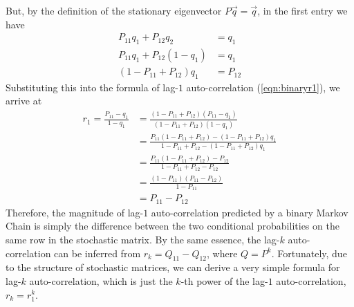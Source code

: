 But, by the definition of the stationary eigenvector $P\vec{q} = \vec{q}$, in the first entry we have
\begin{align*}
P_{11}q_1 + P_{12}q_2 &= q_1 \\
P_{11}q_1 + P_{12}(1-q_1) &= q_1 \\
(1 - P_{11} + P_{12}) q_1 &= P_{12}
\end{align*}
Substituting this into the formula of lag-$1$ auto-correlation (\ref{eqn:binaryr1}), we arrive at
\begin{align}
r_1 = \frac{P_{11}-q_1}{1-q_1} &= \frac{(1 - P_{11} + P_{12})(P_{11}-q_1)}{(1 - P_{11} + P_{12})(1-q_1)}  \nonumber \\
&= \frac{P_{11}(1 - P_{11} + P_{12}) - (1 - P_{11} + P_{12})q_1}{1 - P_{11} + P_{12} - (1 - P_{11} + P_{12})q_1}  \nonumber \\
&= \frac{P_{11}(1 - P_{11} + P_{12}) - P_{12}}{1 - P_{11} + P_{12} - P_{12}} \nonumber  \\
&= \frac{(1-P_{11})(P_{11}-P_{12})}{1 - P_{11}} \nonumber  \\
&= P_{11} - P_{12}
\end{align}
Therefore, the magnitude of lag-$1$ auto-correlation predicted by a binary Markov Chain is simply the difference between the two conditional probabilities on the same row in the stochastic matrix. By the same essence, the lag-$k$ auto-correlation can be inferred from $r_k = Q_{11} - Q_{12}$, where $Q = P^k$. Fortunately, due to the structure of stochastic matrices, we can derive a very simple formula for lag-$k$ auto-correlation, which is just the $k$-th power of the lag-$1$ auto-correlation, $r_k = r_1^k$.

